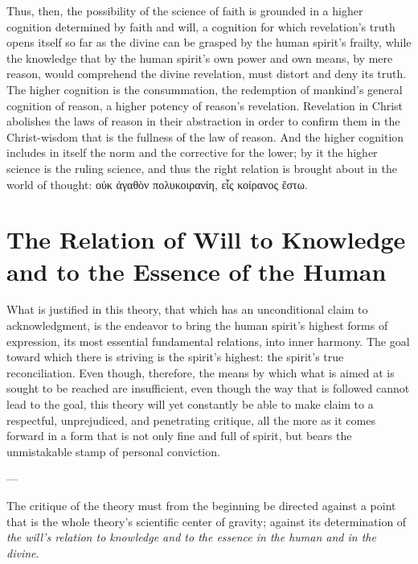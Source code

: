 \documentclass[12pt,a4paper]{book}
\begin{document}
Thus, then, the possibility of the science of faith is grounded in a higher
cognition determined by faith and will, a cognition for which revelation's truth
opens itself so far as the divine can be grasped by the human spirit's frailty,
while the knowledge that by the human spirit's own power and own means, by mere
reason, would comprehend the divine revelation, must distort and deny its truth.
The higher cognition is the consummation, the redemption of mankind's general
cognition of reason, a higher potency of reason's revelation. Revelation in Christ
abolishes the laws of reason in their abstraction in order to confirm them in the
Christ-wisdom that is the fullness of the law of reason. And the higher cognition
includes in itself the norm and the corrective for the lower; by it the higher
science is the ruling science, and thus the right relation is brought about in the
world of thought: οὐκ ἀγαθὸν πολυκοιρανίη, εἷς κοίρανος ἔστω.

\section{The Relation of Will to Knowledge and to the Essence
  of the Human}
\label{sec:will-knowledge}

What is justified in this theory, that which has an unconditional claim to
acknowledgment, is the endeavor to bring the human spirit's highest forms of
expression, its most essential fundamental relations, into inner harmony. The goal
toward which there is striving is the spirit's highest: the spirit's true
reconciliation. Even though, therefore, the means by which what is aimed at is
sought to be reached are insufficient, even though the way that is followed cannot
lead to the goal, this theory will yet constantly be able to make claim to a
respectful, unprejudiced, and penetrating critique, all the more as it comes
forward in a form that is not only fine and full of spirit, but bears the
unmistakable stamp of personal conviction.

\begin{center}
---
\end{center}

The critique of the theory must from the beginning be directed against a point
that is the whole theory's scientific center of gravity; against its determination
of \emph{the will's relation to knowledge and to the essence in the human and in the
divine}.
\end{document}
